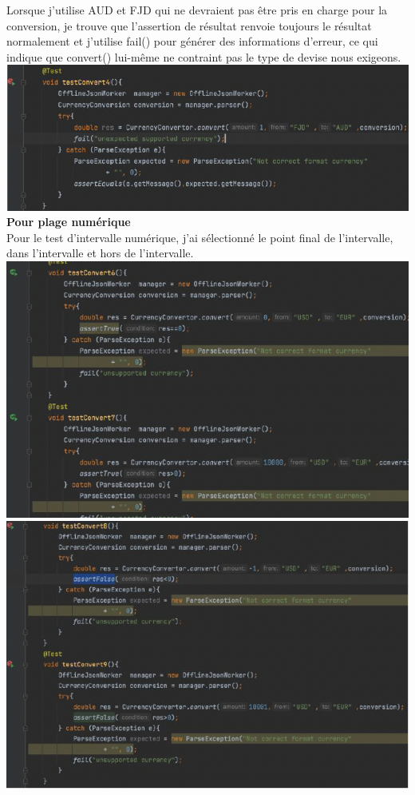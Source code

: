 \documentclass{article}
\begin{document}
Lorsque j'utilise AUD et FJD qui ne devraient pas être pris en charge pour la conversion, je trouve que l'assertion de résultat renvoie toujours le résultat normalement et j'utilise fail() pour générer des informations d'erreur, ce qui indique que convert() lui-même ne contraint pas le type de devise nous exigeons.\\
\includegraphics[scale=0.7]{G3.png}\\

\textbf{Pour plage numérique}\\

Pour le test d'intervalle numérique, j'ai sélectionné le point final de l'intervalle, dans l'intervalle et hors de l'intervalle.\\
\includegraphics[scale=0.6]{G4.png} \includegraphics[scale=0.65]{G5.png}\\
\end{document}
